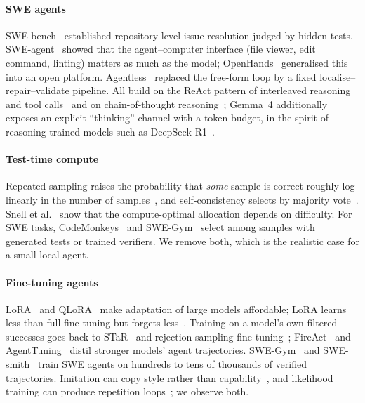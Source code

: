 \documentclass[conference]{IEEEtran}
\begin{document}
\paragraph*{SWE agents} SWE-bench~\cite{jimenez2024swebench} established repository-level issue resolution judged by hidden tests. SWE-agent~\cite{yang2024sweagent} showed that the agent--computer interface (file viewer, edit command, linting) matters as much as the model; OpenHands~\cite{wang2024openhands} generalised this into an open platform. Agentless~\cite{xia2024agentless} replaced the free-form loop by a fixed localise--repair--validate pipeline. All build on the ReAct pattern of interleaved reasoning and tool calls~\cite{yao2023react} and on chain-of-thought reasoning~\cite{wei2022cot}; Gemma~4 additionally exposes an explicit ``thinking'' channel with a token budget, in the spirit of reasoning-trained models such as DeepSeek-R1~\cite{deepseek2025r1}.

\paragraph*{Test-time compute} Repeated sampling raises the probability that \emph{some} sample is correct roughly log-linearly in the number of samples~\cite{brown2024monkeys}, and self-consistency selects by majority vote~\cite{wang2023selfconsistency}. Snell et al.~\cite{snell2024scaling} show that the compute-optimal allocation depends on difficulty. For SWE tasks, CodeMonkeys~\cite{ehrlich2025codemonkeys} and SWE-Gym~\cite{pan2025swegym} select among samples with generated tests or trained verifiers. We remove both, which is the realistic case for a small local agent.

\paragraph*{Fine-tuning agents} LoRA~\cite{hu2022lora} and QLoRA~\cite{dettmers2023qlora} make adaptation of large models affordable; LoRA learns less than full fine-tuning but forgets less~\cite{biderman2024lessforgets}. Training on a model's own filtered successes goes back to STaR~\cite{zelikman2022star} and rejection-sampling fine-tuning~\cite{yuan2023rft}; FireAct~\cite{chen2023fireact} and AgentTuning~\cite{zeng2023agenttuning} distil stronger models' agent trajectories. SWE-Gym~\cite{pan2025swegym} and SWE-smith~\cite{yang2025swesmith} train SWE agents on hundreds to tens of thousands of verified trajectories. Imitation can copy style rather than capability~\cite{gudibande2023false}, and likelihood training can produce repetition loops~\cite{holtzman2020degeneration}; we observe both.
\end{document}
